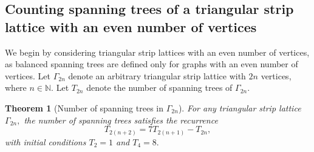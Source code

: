 \documentclass{amsart}
\newtheorem{theorem}{Theorem}[section]
\theoremstyle{definition}
\begin{document}
\subsection{Counting spanning trees of a triangular strip lattice with an even number of vertices}\label{thm:spanningtrees}
We begin by considering triangular strip lattices with an even number of vertices, as balanced spanning trees are defined only for graphs with an even number of vertices. Let $\Gamma_{2n}$ denote an arbitrary triangular strip lattice with $2n$ vertices, where $n \in \mathbb{N}.$ Let $T_{2n}$ denote the number of spanning trees of $\Gamma_{2n}.$

\begin{theorem}[Number of spanning trees in $\Gamma_{2n}$]\label{thm:spanningtrees}
For any triangular strip lattice $\Gamma_{2n},$ the number of spanning trees satisfies the recurrence
\[T_{2(n+2)} = 7T_{2(n+1)} - T_{2n},\]
with initial conditions $T_2=1$ and $T_4=8.$
\end{theorem}
\end{document}
